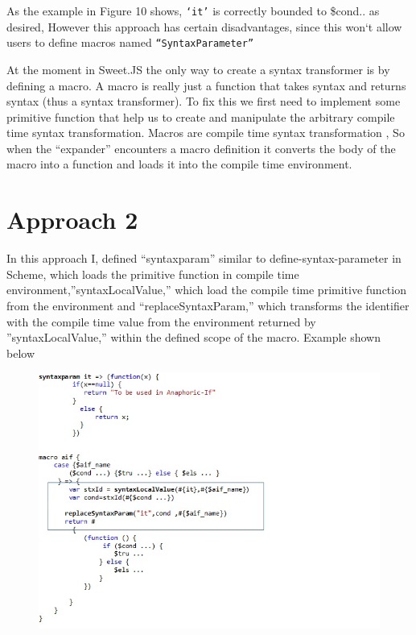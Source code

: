 As the example in Figure 10 shows, \texttt{`it'} is correctly bounded to \$cond.. as desired, However this approach has certain disadvantages, since this won`t allow users to define macros named \texttt{``SyntaxParameter''} 

At the moment in Sweet.JS the only way to create a syntax transformer is by defining a macro. A macro is really just a function that takes syntax and returns syntax (thus a syntax transformer). To fix this we first need to implement some primitive function that help us to create and manipulate the arbitrary compile time syntax transformation. Macros are compile time syntax transformation , So when the ``expander'' encounters a macro definition it converts the body of the macro into a function and loads it into the compile time environment.
\newpage
\section{Approach 2}

In this approach I, defined ``syntaxparam'' similar to define-syntax-parameter in Scheme, which loads the primitive function in compile time environment,''syntaxLocalValue,'' which load the compile time primitive function from the environment and ``replaceSyntaxParam,'' which transforms the identifier with the compile time value from the environment returned by ''syntaxLocalValue,''  within the defined scope of the macro. Example shown below

\begin{figure}[htb]
\centering
\includegraphics[width=1.0\textwidth]{images/Appraoch21.jpg}

\label{fig:AST4}
\end{figure}

